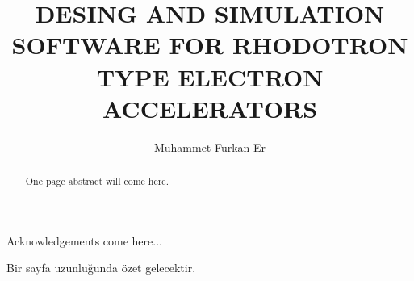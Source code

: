 \documentclass[a4paper,oneside,12pt]{report}
\title{DESING AND SIMULATION SOFTWARE FOR RHODOTRON TYPE ELECTRON ACCELERATORS}
\author{Muhammet Furkan Er}
\numberwithin{equation}{chapter}
\begin{document}
\makemstitle %
\makeapprovalpage

\begin{acknowledgements}
Acknowledgements come here...
\end{acknowledgements}

\begin{abstract}
One page abstract will come here.  
\end{abstract}

\begin{ozet}
Bir sayfa uzunluğunda özet gelecektir.
\end{ozet}

\tableofcontents
\listoffigures
\listoftables





\newcommand{\vecthreeBF}[1]{\vec{\textbf{#1}}}
\newcommand{\vecthree}[1]{\vec{#1}}
\newcommand{\vecNum}[3]{(#1, #2, #3)}

\newcommand{\parDeriv}[2]{\frac{\partial #1}{\partial #2}}
\newcommand{\parDerivS}[2]{\frac{\partial^2 #1}{\partial #2^2}}
\newcommand{\derivS}[2]{\frac{d^2 #1}{d#2^2}}

\newcommand{\dotProdBF}[2]{\vecthreeBF{#1} \cdot \vecthreeBF{#2}}
\newcommand{\dotProd}[2]{\vecthree{#1} \cdot \vecthree{#2}}

\newcommand{\crossProdBF}[2]{\vecthreeBF{#1} \times \vecthreeBF{#2}}
\newcommand{\crossProd}[2]{\vecthree{#1} \times \vecthree{#2}}

\newcommand{\e}{$\textbf{e}^-$ }
\newcommand{\egun}{$\textbf{e}^-$-gun }
\newcommand{\eB}{$\textbf{e}^-$ - $\vecthreeBF{B}$ }
\newcommand{\eE}{$\textbf{e}^-$ - $\vecthreeBF{E}$ }
\newcommand{\eEM}{$\textbf{e}^-$ - \textbf{EM} }
\newcommand{\ee}{$\textbf{e}^-$ - $\textbf{e}^-$ }


\newcommand{\fromeq}[1]{\textit{equation \ref{eq:#1}}}
\newcommand{\fromeqs}[2]{\textit{equations \ref{eq:#1} and \ref{eq:#2}}}
\newcommand{\fromeqsth}[3]{\textit{equations \ref{eq:#1}, \ref{eq:#2} and \ref{eq:#3}}}
\newcommand{\fromeqsf}[4]{\textit{equations \ref{eq:#1}, \ref{eq:#2}, \ref{eq:#3} and \ref{eq:#4}}}

\newcommand{\fromfig}[1]{\textit{figure \ref{fig:#1}}}
\newcommand{\fromfigs}[2]{\textit{figures \ref{fig:#1} and \ref{fig:#2}}}
\newcommand{\fromfigf}[4]{\textit{figures \ref{fig:#1}, \ref{fig:#2}, \ref{fig:#3} and \ref{fig:#4}}}
\newcommand{\fromfigsix}[6]{\textit{figures \ref{fig:#1}, \ref{fig:#2}, \ref{fig:#3}, \ref{fig:#4}, \ref{fig:#5} and \ref{fig:#6}}}
\end{document}
